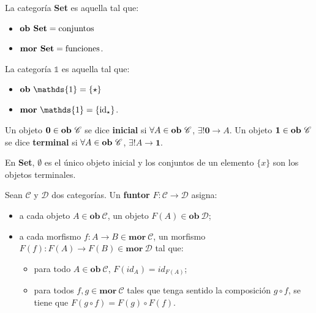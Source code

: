 \begin{ejemplo}
La categoría \textbf{Set} es aquella tal que:
\begin{itemize}[noitemsep,label=$\blacktriangleright$]
	\item $\text{\bf ob Set} = \text{conjuntos}$
	\item $\text{\bf mor Set} = \text{funciones}$. 
\end{itemize}
\end{ejemplo}
\begin{ejemplo}
La categoría $\mathds{1}$ es aquella tal que:
\begin{itemize}[noitemsep,label=$\blacktriangleright$]
	\item $\text{\bf ob} \ \mathds{1} = \{\star\}$
	\item $\text{\bf mor} \ \mathds{1} = \{\text{id}_{\star}\}$. 
\end{itemize}
\end{ejemplo}

\begin{definition}
Un objeto $\mathbf{0} \in \text{\bf ob} \ \mathscr{C}$ se dice \textbf{inicial} si $\forall A \in \text{\bf ob} \ \mathscr{C}$, $\exists! \mathbf{0} \rightarrow A$. 
Un objeto $\mathbf{1} \in \text{\bf ob} \ \mathscr{C}$ se dice \textbf{terminal} si $\forall A \in \text{\bf ob} \ \mathscr{C}$, $\exists! A \rightarrow \mathbf{1}$.
\end{definition}

\begin{ejemplo} 
En \textbf{Set}, $\emptyset$ es el único objeto inicial y los conjuntos de un elemento $\{x\}$ son los objetos terminales.
\end{ejemplo}
 
\begin{definition}[Funtor]
Sean $\mathscr{C}$ y $\mathscr{D}$ dos categorías. Un \textbf{funtor} $\mathit{F} : \mathscr{C} \rightarrow \mathscr{D}$ asigna:
\begin{itemize}[noitemsep,label=$\blacktriangleright$]
	\item a cada objeto $A \in \mathbf{ob} \ \mathscr{C}$, un objeto $\mathit{F}(A) \in \mathbf{ob} \ \mathscr{D}$;
	\item a cada morfismo $f : A \rightarrow B \in \mathbf{mor} \ \mathscr{C}$, un morfismo $\mathit{F}(f) : \mathit{F}(A) \rightarrow \mathit{F}(B) \in \mathbf{mor} \ \mathscr{D}$ tal que: 
	\begin{itemize}[noitemsep,label=$\bullet$]
		\item para todo $A \in \mathbf{ob} \ \mathscr{C}$, $\mathit{F}(id_A) = id_{\mathit{F}(A)}$;
		\item para todos $f,g \in \mathbf{mor} \ \mathscr{C}$ tales que tenga sentido la composición $g \circ f$, se tiene que $\mathit{F}(g \circ f) = \mathit{F}(g) \circ \mathit{F}(f)$.
	\end{itemize}
\end{itemize}
\end{definition}

